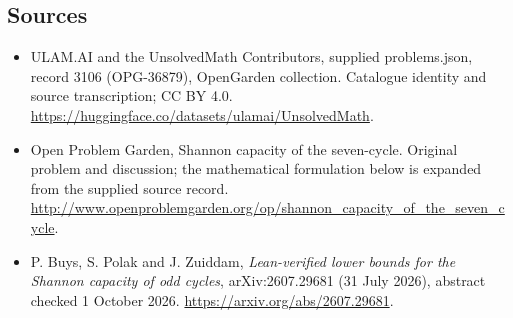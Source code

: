 \documentclass[11pt,a4paper]{article}
\begin{document}
\subsection{Sources}
\begin{itemize}
\item[S1] ULAM.AI and the UnsolvedMath Contributors, supplied problems.json, record 3106 (OPG-36879), OpenGarden collection. Catalogue identity and source transcription; CC BY 4.0.
\url{https://huggingface.co/datasets/ulamai/UnsolvedMath}.
\item[S2] Open Problem Garden, Shannon capacity of the seven-cycle. Original problem and discussion; the mathematical formulation below is expanded from the supplied source record.
\url{http://www.openproblemgarden.org/op/shannon_capacity_of_the_seven_cycle}.
\item[R1] P. Buys, S. Polak and J. Zuiddam, \emph{Lean-verified lower bounds for the Shannon capacity of odd cycles}, arXiv:2607.29681 (31 July 2026), abstract checked 1 October 2026.
\url{https://arxiv.org/abs/2607.29681}.
\end{itemize}
\end{document}
